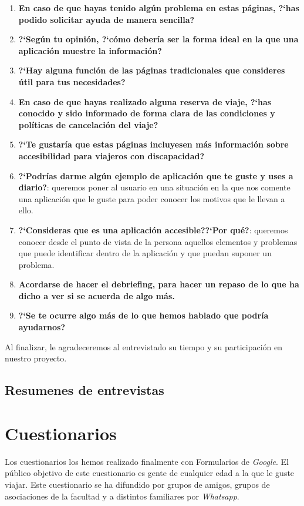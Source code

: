 \begin{enumerate}
    \item {\textbf{En caso de que hayas tenido algún problema en estas páginas, ?`has podido solicitar ayuda de manera sencilla?}}
    \item {\textbf{?`Según tu opinión, ?`cómo debería ser la forma ideal en la que una aplicación muestre la información?}}
    \item {\textbf{?`Hay alguna función de las páginas tradicionales que consideres útil para tus necesidades?}}
    \item {\textbf{En caso de que hayas realizado alguna reserva de viaje, ?`has conocido y sido informado de forma clara de las condiciones
                        y políticas de cancelación del viaje?}}
    \item {\textbf{?`Te gustaría que estas páginas incluyesen más información sobre accesibilidad para viajeros con discapacidad?}}
    \item {\textbf{?`Podrías darme algún ejemplo de aplicación que te guste y uses a diario?}}: queremos poner al usuario en una situación
    en la que nos comente una aplicación que le guste para poder conocer los motivos que le llevan a ello.
    \item {\textbf{?`Consideras que es una aplicación accesible??`Por qué?}}: queremos conocer desde el punto de vista de la persona aquellos
    elementos y problemas que puede identificar dentro de la aplicación y que puedan suponer un problema.
    \item {\textbf{Acordarse de hacer el debriefing, para hacer un repaso de lo que ha dicho a ver si se acuerda de algo más.}}
    \item {\textbf{?`Se te ocurre algo más de lo que hemos hablado que podría ayudarnos?}}
\end{enumerate}

Al finalizar, le agradeceremos al entrevistado su tiempo y su participación en nuestro proyecto.


\subsection{Resumenes de entrevistas}

\section{Cuestionarios}

Los cuestionarios los hemos realizado finalmente con Formularios de \textit{Google}. El público objetivo de este cuestionario es gente de cualquier edad a la que le guste viajar. Este cuestionario se ha difundido por grupos de amigos, grupos de asociaciones de la facultad y a distintos familiares por \textit{Whatsapp}.

